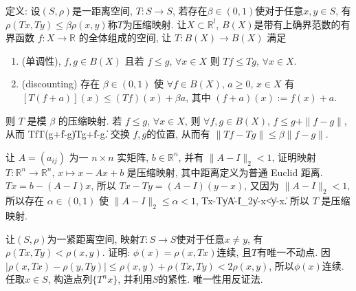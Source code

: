 定义: 设$(S,\rho)$是一距离空间, $T: S\to S$, 若存在$\beta\in(0,1)$使对于任意$x,y\in S$, 有$\rho(Tx, Ty)\le\beta\rho(x,y)$称$T$为压缩映射.
让$X\subset \mathbb{R}^l$, $B(X)$是带有上确界范数的有界函数 $f: X\to \mathbb{R}$ 的全体组成的空间, 让 $T: B(X)\to B(X)$ 满足
\begin{enumerate}[1)]
 \item (单调性), $f,g\in B(X)$ 且若 $f\le g$, $\forall x\in X$ 则 $Tf\le Tg$, $\forall x\in X$.
 \item (discounting) 存在 $\beta\in(0,1)$ 使 $\forall f\in B(X)$, $a\ge 0$, $x\in X$ 有 $[T(f+a)](x)\le(Tf)(x)+\beta a$, 其中 $(f+a)(x):= f(x)+a$.
\end{enumerate}
则 $T$ 是模 $\beta$ 的压缩映射.
\et
\eq
\ba
若 $f\le g$, $\forall x\in X$, 则 $\forall f,g\in B(X)$, $f\le g+\|f-g\|$, 从而
\bee
Tf\le T(g+\|f-g\|)\le Tg+\beta \|f-g\|.
\eee
交换 $f,g$的位置, 从而有 $\|Tf-Tg\|\le\beta\|f-g\|$.
\ea

让 $A=(a_{ij})$ 为一 $n\times n$ 实矩阵, $b\in\mathbb{R}^n$, 并有 $\|A-I\|_2<1$, 证明映射 $T:\mathbb{R}^n\to\mathbb{R}^n$, $x\mapsto x-Ax+b$ 是压缩映射,
其中距离定义为普通 Euclid 距离.
\eq
\ba
$Tx=b-(A-I)x$, 所以 $Tx-Ty=(A-I)(y-x)$, 又因为 $\|A-I\|_2<1$, 所以存在 $\alpha\in(0,1)$ 使 $\|A-I\|_2\le \alpha<1$, 
\bee
\|Tx-Ty\|\le \|A-I\|_2\cdot\|y-x\|<\alpha\|y-x\|.
\eee
所以 $T$ 是压缩映射.
\ea

让$(S,\rho)$为一紧距离空间, 映射$T:S\to S$使对于任意$x\ne y$, 有$\rho(Tx, Ty)<\rho(x,y)$.
证明: $\phi(x)=\rho(x,Tx)$连续, 且$T$有唯一不动点.
\eq
\ba
因$|\rho(x, Tx)-\rho(y,Ty)|\le \rho(x,y)+\rho(Tx, Ty)<2\rho(x,y)$, 所以$\phi(x)$连续. 任取$x\in S$, 构造点列$\{T^nx\}$, 并利用$S$的紧性.
唯一性用反证法.
\ea
